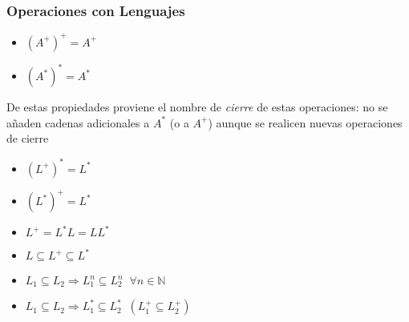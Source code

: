 \begin{frame}
  \frametitle{Operaciones con Lenguajes}
      \begin{teor}
           \begin{itemize}
					 \item $(A^+)^+ = A^+$
					 \item $(A^*)^* = A^*$
           \end{itemize}
      \pause De estas propiedades proviene el nombre de \textit{cierre} de estas operaciones: no se añaden
			       cadenas adicionales a $A^*$ (o a $A^+$) aunque se realicen nuevas operaciones de cierre

      \pause 
           \begin{itemize}[<+->]
					 \item $(L^+)^* = L^*$
					 \item $(L^*)^+ = L^*$
					 \item $L^+ = L^* L = L L^*$
					 \item $L \subseteq L^+ \subseteq L^*$
					 \item $L_1 \subseteq L_2 \Rightarrow L_1^n \subseteq L_2^n \; \; \forall n \in \mathbb{N}$
					 \item $L_1 \subseteq L_2 \Rightarrow L_1^* \subseteq L_2^* \; \; (L_1^+ \subseteq L_2^+)$
           \end{itemize}
      \end{teor}

\end{frame}
